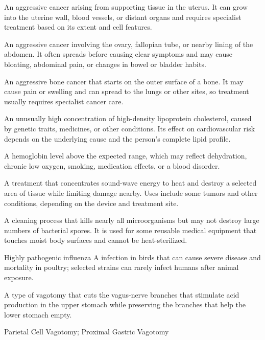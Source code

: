 An aggressive cancer arising from supporting tissue in the uterus. It can grow into the uterine wall, blood vessels, or distant organs and requires specialist treatment based on its extent and cell features.

 An aggressive cancer involving the ovary, fallopian tube, or nearby lining of the abdomen. It often spreads before causing clear symptoms and may cause bloating, abdominal pain, or changes in bowel or bladder habits.

 An aggressive bone cancer that starts on the outer surface of a bone. It may cause pain or swelling and can spread to the lungs or other sites, so treatment usually requires specialist cancer care.

 An unusually high concentration of high-density lipoprotein cholesterol, caused by genetic traits, medicines, or other conditions. Its effect on cardiovascular risk depends on the underlying cause and the person’s complete lipid profile.

 A hemoglobin level above the expected range, which may reflect dehydration, chronic low oxygen, smoking, medication effects, or a blood disorder.

 A treatment that concentrates sound-wave energy to heat and destroy a selected area of tissue while limiting damage nearby. Uses include some tumors and other conditions, depending on the device and treatment site.

 A cleaning process that kills nearly all microorganisms but may not destroy large numbers of bacterial spores. It is used for some reusable medical equipment that touches moist body surfaces and cannot be heat-sterilized.

 Highly pathogenic influenza A infection in birds that can cause severe disease and mortality in poultry; selected strains can rarely infect humans after animal exposure.

 A type of vagotomy that cuts the vagus-nerve branches that stimulate acid production in the upper stomach while preserving the branches that help the lower stomach empty.

\synonyms
Parietal Cell Vagotomy; Proximal Gastric Vagotomy

